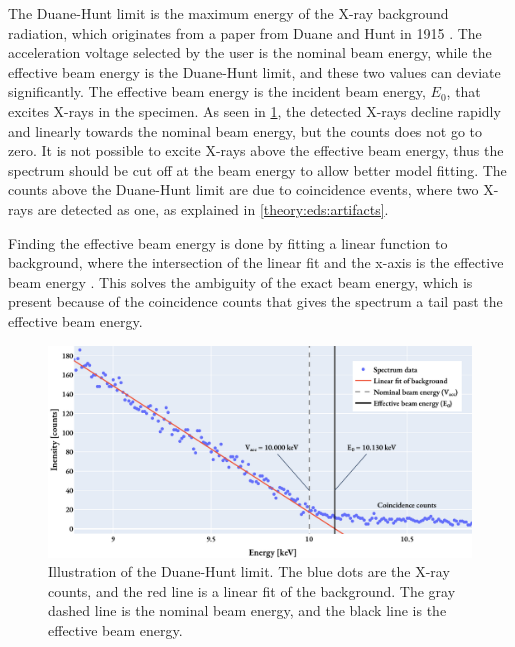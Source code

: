 The Duane-Hunt limit is the maximum energy of the X-ray background radiation, which originates from a paper from Duane and Hunt in 1915 \cite{Duane_Hunt_1915}.
The acceleration voltage selected by the user is the nominal beam energy, while the effective beam energy is the Duane-Hunt limit, and these two values can deviate significantly.
The effective beam energy is the incident beam energy, $E_0$, that excites X-rays in the specimen.
As seen in \cref{fig:duanehunt}, the detected X-rays decline rapidly and linearly towards the nominal beam energy, but the counts does not go to zero.
It is not possible to excite X-rays above the effective beam energy, thus the spectrum should be cut off at the beam energy to allow better model fitting.
The counts above the Duane-Hunt limit are due to coincidence events, where two X-rays are detected as one, as explained in \cref{theory:eds:artifacts}.


Finding the effective beam energy is done by fitting a linear function to background, where the intersection of the linear fit and the x-axis is the effective beam energy \cite{software_dtsaii} \cite[Ch. 9.1.3]{goldstein_scanning_2018}.
This solves the ambiguity of the exact beam energy, which is present because of the coincidence counts that gives the spectrum a tail past the effective beam energy.

\begin{figure}[ht]
    \centering
    \includegraphics[width=0.8\linewidth]{figures/Duane-Hunt.pdf}
    \caption{
        Illustration of the Duane-Hunt limit.
        The blue dots are the X-ray counts, and the red line is a linear fit of the background.
        The gray dashed line is the nominal beam energy, and the black line is the effective beam energy.
    }
    \label{fig:duanehunt}
\end{figure}


